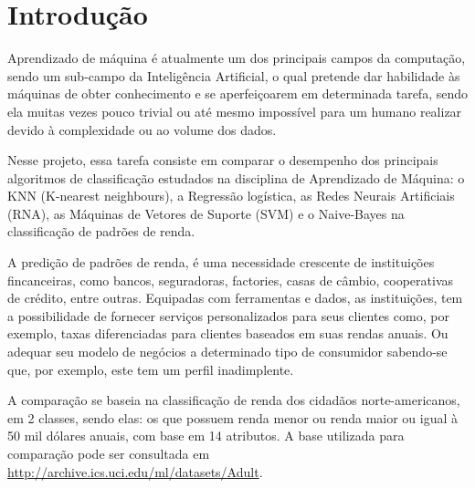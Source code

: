 \section{Introdução}
Aprendizado de máquina é atualmente um dos principais campos da computação, sendo um sub-campo da Inteligência Artificial, o qual pretende dar habilidade às máquinas de obter conhecimento e se aperfeiçoarem em determinada tarefa, sendo ela muitas vezes pouco trivial ou até mesmo impossível para um humano realizar devido à complexidade ou ao volume dos dados.

Nesse projeto, essa tarefa consiste em comparar o desempenho dos principais algoritmos de classificação estudados na disciplina de Aprendizado de Máquina: o KNN (K-nearest neighbours), a Regressão logística, as Redes Neurais Artificiais (RNA), as Máquinas de Vetores de Suporte (SVM) e o Naive-Bayes na classificação de padrões de renda.

A predição de padrões de renda, é uma necessidade crescente de instituições fincanceiras, como bancos, seguradoras, factories, casas de câmbio, cooperativas de crédito, entre outras. Equipadas com ferramentas e dados, as instituições, tem a possibilidade de fornecer serviços personalizados para seus clientes como, por exemplo, taxas diferenciadas para clientes baseados em suas rendas anuais. Ou adequar seu modelo de negócios a determinado  tipo de consumidor sabendo-se que, por exemplo, este tem um perfil inadimplente\cite{importance}.

A comparação se baseia na classificação de renda dos cidadãos norte-americanos, em 2 classes, sendo elas: os que possuem renda menor ou renda maior ou igual à 50 mil dólares anuais, com base em 14 atributos. A base utilizada para comparação pode ser consultada em \url{http://archive.ics.uci.edu/ml/datasets/Adult}. 